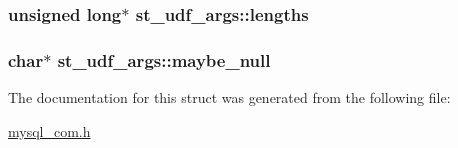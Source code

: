 \subsubsection[{lengths}]{\setlength{\rightskip}{0pt plus 5cm}unsigned long$\ast$ st\+\_\+udf\+\_\+args\+::lengths}\label{structst__udf__args_a33da3ea6885ea39c404e2a6746d16ae2}
\hypertarget{structst__udf__args_a9654fdb453511ebf6044a0fcb1bb72f0}{}
\subsubsection[{maybe\+\_\+null}]{\setlength{\rightskip}{0pt plus 5cm}char$\ast$ st\+\_\+udf\+\_\+args\+::maybe\+\_\+null}\label{structst__udf__args_a9654fdb453511ebf6044a0fcb1bb72f0}


The documentation for this struct was generated from the following file\+:\begin{DoxyCompactItemize}
\item 
\hyperlink{mysql__com_8h}{mysql\+\_\+com.\+h}\end{DoxyCompactItemize}
